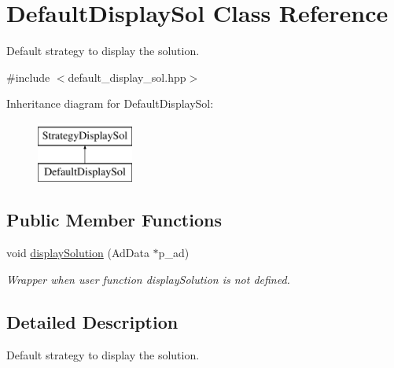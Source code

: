 \hypertarget{classDefaultDisplaySol}{\section{\-Default\-Display\-Sol \-Class \-Reference}
\label{classDefaultDisplaySol}
}


\-Default strategy to display the solution.  




{\ttfamily \#include $<$default\-\_\-display\-\_\-sol.\-hpp$>$}

\-Inheritance diagram for \-Default\-Display\-Sol\-:\begin{figure}[H]
\begin{center}
\leavevmode
\includegraphics[height=2.000000cm]{classDefaultDisplaySol}
\end{center}
\end{figure}
\subsection*{\-Public \-Member \-Functions}
\begin{DoxyCompactItemize}
\item 
void \hyperlink{classDefaultDisplaySol_ab80dde5db4b38e88dba892c5cf94c777}{display\-Solution} (\-Ad\-Data $\ast$p\-\_\-ad)
\begin{DoxyCompactList}\small\item\em \-Wrapper when user function display\-Solution is not defined. \end{DoxyCompactList}\end{DoxyCompactItemize}


\subsection{\-Detailed \-Description}
\-Default strategy to display the solution. 

